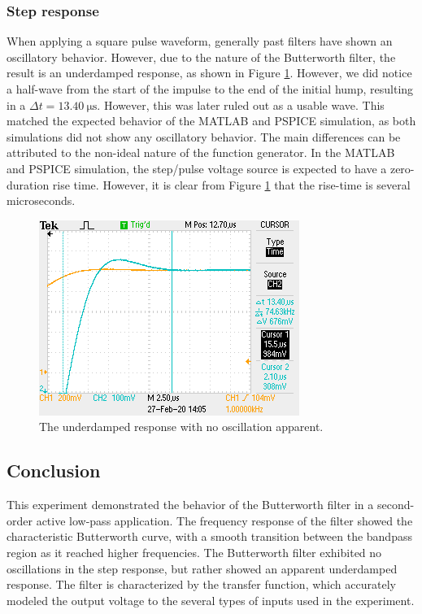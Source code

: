 \documentclass{report}
\begin{document}
\subsubsection{Step response}
When applying a square pulse waveform, generally past filters have shown an oscillatory behavior. However, due to the nature of the Butterworth filter, the result is an underdamped response, as shown in Figure \ref{fig:f0004tek}. However, we did notice a half-wave from the start of the impulse to the end of the initial hump, resulting in a $\Delta t = \SI{13.40}{\us}$. However, this was later ruled out as a usable wave. This matched the expected behavior of the MATLAB and PSPICE simulation, as both simulations did not show any oscillatory behavior. The main differences can be attributed to the non-ideal nature of the function generator. In the MATLAB and PSPICE simulation, the step/pulse voltage source is expected to have a zero-duration rise time. However, it is clear from Figure \ref{fig:f0004tek} that the rise-time is several microseconds.
\begin{figure}[h]
	\centering
	\includegraphics[width=0.4\linewidth]{"Lab 6 Pics/F0004TEK"}
	\caption{The underdamped response with no oscillation apparent.}
	\label{fig:f0004tek}
\end{figure}
\subsection{Conclusion}
This experiment demonstrated the behavior of the Butterworth filter in a second-order active low-pass application. The frequency response of the filter showed the characteristic Butterworth curve, with a smooth transition between the bandpass region as it reached higher frequencies. The Butterworth filter exhibited no oscillations in the step response, but rather showed an apparent underdamped response. The filter is characterized by the transfer function, which accurately modeled the output voltage to the several types of inputs used in the experiment.


\pagebreak
\end{document}
